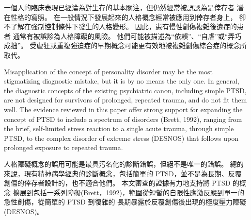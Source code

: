 \documentclass[12pt]{article}
\begin{document}
    一個人的臨床表現已經淪為對生存的基本關注，但仍然經常被誤認為是倖存者
    潛在性格的寫照。 在一般情況下發展起來的人格概念經常被應用到倖存者身上，
    卻不了解在強制控制條件下發生的人格變形。 因此，患有慢性創傷複雜後遺症的患者
    通常有被誤診為人格障礙的風險。 他們可能被描述為“依賴”、“自虐”或“弄巧成拙”。
    受虐狂或重複強迫症的早期概念可能更有效地被複雜創傷綜合症的概念所取代。

    Misapplication of the concept of personality disorder may be the most
    stigmatizing diagnostic mistake, but it is by no means the only one. In
    general, the diagnostic concepts of the existing psychiatric canon,
    including simple PTSD, are not designed for survivors of prolonged,
    repeated trauma, and do not fit them well. The evidence reviewed in this
    paper offer strong support for expanding the concept of PTSD to include a
    spectrum of disorders (Brett, 1992), ranging from the brief, self-limited
    stress reaction to a single acute trauma, through simple PTSD, to the
    complex disorder of extreme stress (DESNOS) that follows upon prolonged
    exposure to repeated trauma.

    人格障礙概念的誤用可能是最具污名化的診斷錯誤，但絕不是唯一的錯誤。
    總的來說，現有精神病學經典的診斷概念，包括簡單的 PTSD，並不是為長期、反覆
    創傷的倖存者設計的，也不適合他們。 本文審查的證據有力地支持將 PTSD 的概念
    擴展到包括一系列障礙(Brett，1992)，範圍從短暫的自限性應激反應到單一的
    急性創傷，從簡單的 PTSD 到復雜的 長期暴露於反覆創傷後出現的極度壓力障礙
    (DESNOS)。
\end{document}
